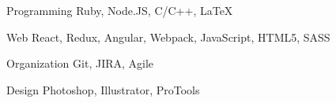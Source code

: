 

\begin{cvskills}

  \cvskill
    {Programming} %
    {Ruby, Node.JS, C/C++, LaTeX} %

  \cvskill
    {Web} %
    {React, Redux, Angular, Webpack, JavaScript, HTML5, SASS} %

  \cvskill
    {Organization} %
    {Git, JIRA, Agile} %

  \cvskill
    {Design} %
    {Photoshop, Illustrator, ProTools} %

\end{cvskills}
